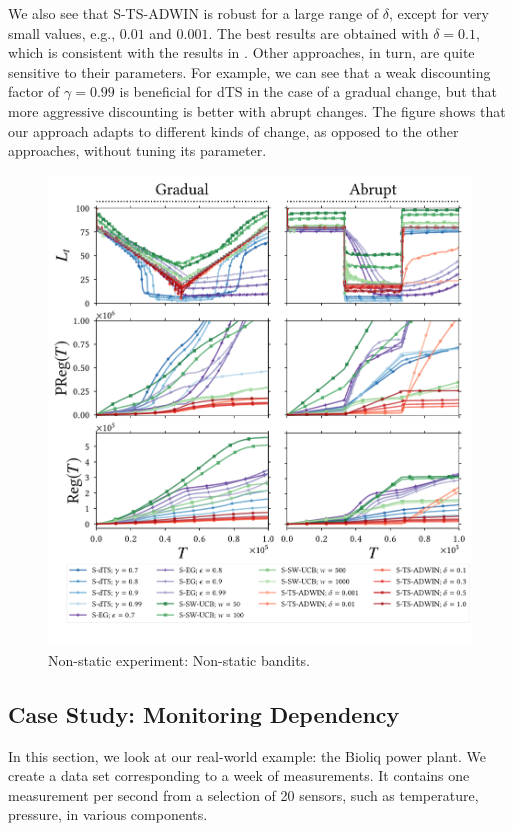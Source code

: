 We also see that \gls{S-TS-ADWIN} is robust for a large range of $\delta$, except for very small values, e.g., $0.01$ and $0.001$. The best results are obtained with $\delta = 0.1$, which is consistent with the results in \cite{DBLP:conf/sdm/BifetG07}. 
Other approaches, in turn, are quite sensitive to their parameters. 
For example, we can see that a weak discounting factor of $\gamma = 0.99$ is beneficial for \gls{dTS} in the case of a gradual change, but that more aggressive discounting is better with abrupt changes. 
The figure shows that our approach adapts to different kinds of change, as opposed to the other approaches, without tuning its parameter. 
\begin{figure}[ht]
	\centering
		\includegraphics[width=0.85\linewidth, trim=0cm 0cm 0cm 0.5cm]{part3-figures/gradual_abrupt_regret_long-2-compressed.pdf}
	\vspace{-0.8cm}
	\caption{Non-static experiment: Non-static bandits.} 
	\label{non-static-experiment-2}
\end{figure}

\subsection{Case Study: Monitoring Dependency}
\label{sec_streammonitoring}

In this section, we look at our real-world example: the \gls{Bioliq} power plant. We create a data set corresponding to a week of measurements.
It contains one measurement per second from a selection of 20 sensors, such as temperature, pressure, in various components. 


